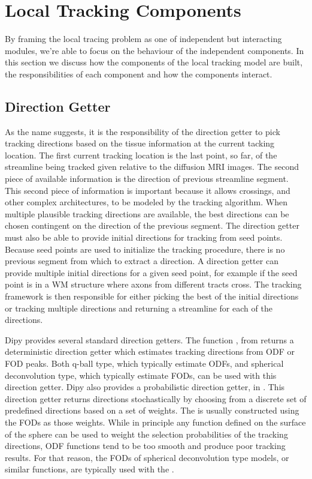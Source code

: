 \section{Local Tracking Components}
    By framing the local tracing problem as one of independent but interacting modules, we're able to focus on the behaviour of the independent components. In this section we discuss how the components of the local tracking model are built, the responsibilities of each component and how the components interact.

\subsection{Direction Getter}
    As the name suggests, it is the responsibility of the direction getter to pick tracking directions based on the tissue information at the current tacking location. The first current tracking location is the last point, so far, of the streamline being tracked given relative to the diffusion MRI images. The second piece of available information is the direction of previous streamline segment. This second piece of information is important because it allows crossings, and other complex architectures, to be modeled by the tracking algorithm. When multiple plausible tracking directions are available, the best directions can be chosen contingent on the direction of the previous segment. The direction getter must also be able to provide initial directions for tracking from seed points. Because seed points are used to initialize the tracking procedure, there is no previous segment from which to extract a direction. A direction getter can provide multiple initial directions for a given seed point, for example if the seed point is in a WM structure where axons from different tracts cross. The tracking framework is then responsible for either picking the best of the initial directions or tracking multiple directions and returning a streamline for each of the directions.
    
    Dipy provides several standard direction getters. The function , from  returns a deterministic direction getter which estimates tracking directions from ODF or FOD peaks. Both q-ball type, which typically estimate ODFs, and spherical deconvolution type, which typically estimate FODs, can be used with this direction getter. Dipy also provides a probabilistic direction getter,  in . This direction getter returns directions stochastically by choosing from a discrete set of predefined directions based on a set of weights. The  is usually constructed using the FODs as those weights. While in principle any function defined on the surface of the sphere can be used to weight the selection probabilities of the tracking directions, ODF functions tend to be too smooth and produce poor tracking results. For that reason, the FODs of spherical deconvolution type models, or similar functions, are typically used with the .

